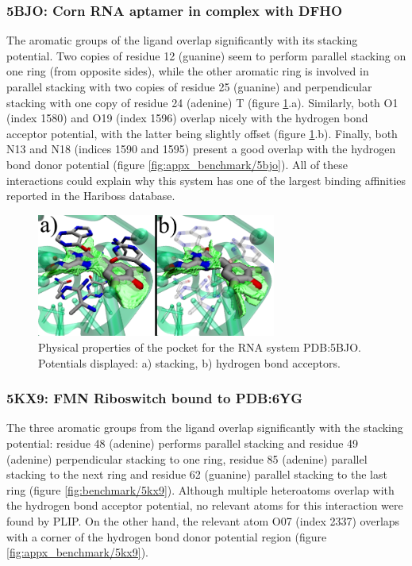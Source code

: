     \subsubsection{5BJO: Corn RNA aptamer in complex with DFHO}
      The aromatic groups of the ligand overlap significantly with its stacking potential. Two copies of residue 12 (guanine) seem to perform parallel stacking on one ring (from opposite sides), while the other aromatic ring is involved in parallel stacking with two copies of residue 25 (guanine) and perpendicular stacking with one copy of residue 24 (adenine) T (figure \ref{fig:benchmark/5bjo}.a). Similarly, both O1 (index 1580) and O19 (index 1596) overlap nicely with the hydrogen bond acceptor potential, with the latter being slightly offset (figure \ref{fig:benchmark/5bjo}.b). Finally, both N13 and N18 (indices 1590 and 1595) present a good overlap with the hydrogen bond donor potential (figure \ref{fig:appx_benchmark/5bjo}). All of these interactions could explain why this system has one of the largest binding affinities reported in the Hariboss database.

      \begin{figure}[H]
        \centering
        \includegraphics[width=0.7\textwidth]{figures/results/benchmark_rna/5bjo.png}
        \caption{\label{fig:benchmark/5bjo} Physical properties of the pocket for the RNA system PDB:5BJO. Potentials displayed: a) stacking, b) hydrogen bond acceptors.}
      \end{figure}

    \subsubsection{5KX9: FMN Riboswitch bound to PDB:6YG}
      The three aromatic groups from the ligand overlap significantly with the stacking potential: residue 48 (adenine) performs parallel stacking and residue 49 (adenine) perpendicular stacking to one ring, residue 85 (adenine) parallel stacking to the next ring and residue 62 (guanine) parallel stacking to the last ring (figure \ref{fig:benchmark/5kx9}). Although multiple heteroatoms overlap with the hydrogen bond acceptor potential, no relevant atoms for this interaction were found by PLIP. On the other hand, the relevant atom O07 (index 2337) overlaps with a corner of the hydrogen bond donor potential region (figure \ref{fig:appx_benchmark/5kx9}).

